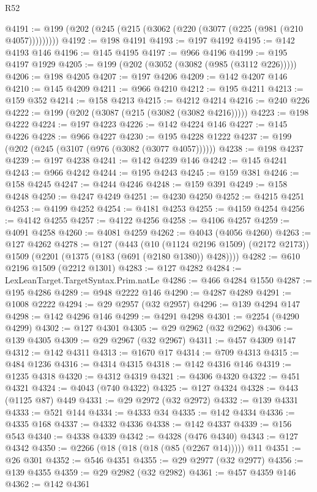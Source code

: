 \begin{lexlean}{R52}
\begin{coremodule}
@4191 := @199 (@202 (@245 (@215 (@3062 (@220 (@3077 (@225 (@981 (@210 @4057)))))))))
@4192 := @198 @4191
@4193 := @197 @4192
@4195 := @142 @4193 @146
@4196 := @145 @4195
@4197 := @966 @4196
@4199 := @195 @4197 @1929
@4205 := @199 (@202 (@3052 (@3082 (@985 (@3112 @226)))))
@4206 := @198 @4205
@4207 := @197 @4206
@4209 := @142 @4207 @146
@4210 := @145 @4209
@4211 := @966 @4210
@4212 := @195 @4211
@4213 := @159 @352
@4214 := @158 @4213
@4215 := @4212 @4214
@4216 := @240 @226
@4222 := @199 (@202 (@3087 (@215 (@3082 (@3082 @4216)))))
@4223 := @198 @4222
@4224 := @197 @4223
@4226 := @142 @4224 @146
@4227 := @145 @4226
@4228 := @966 @4227
@4230 := @195 @4228 @1222
@4237 := @199 (@202 (@245 (@3107 (@976 (@3082 (@3077 @4057))))))
@4238 := @198 @4237
@4239 := @197 @4238
@4241 := @142 @4239 @146
@4242 := @145 @4241
@4243 := @966 @4242
@4244 := @195 @4243
@4245 := @159 @381
@4246 := @158 @4245
@4247 := @4244 @4246
@4248 := @159 @391
@4249 := @158 @4248
@4250 := @4247 @4249
@4251 := @4230 @4250
@4252 := @4215 @4251
@4253 := @4199 @4252
@4254 := @4181 @4253
@4255 := @4159 @4254
@4256 := @4142 @4255
@4257 := @4122 @4256
@4258 := @4106 @4257
@4259 := @4091 @4258
@4260 := @4081 @4259
@4262 := @4043 (@4056 @4260)
@4263 := @127 @4262
@4278 := @127
    (@443
      (@10 (@1124 @2196 @1509) (@2172 @2173))
      @1509
      (@2201 (@1375 (@183 (@691 (@2180 @1380)) @428))))
@4282 := @610 @2196 @1509 (@2212 @1301)
@4283 := @127 @4282
@4284 := LexLeanTarget.TargetSyntax.Prim.natLe
@4286 := @466 @4284 @1550
@4287 := @195 @4286
@4289 := @948 @2222 @146
@4290 := @4287 @4289
@4291 := @1008 @2222
@4294 := @29 @2957 (@32 @2957)
@4296 := @139 @4294 @147
@4298 := @142 @4296 @146
@4299 := @4291 @4298
@4301 := @2254 (@4290 @4299)
@4302 := @127 @4301
@4305 := @29 @2962 (@32 @2962)
@4306 := @139 @4305
@4309 := @29 @2967 (@32 @2967)
@4311 := @457 @4309 @147
@4312 := @142 @4311
@4313 := @1670 @17
@4314 := @709 @4313
@4315 := @484 @1236
@4316 := @4314 @4315
@4318 := @142 @4316 @146
@4319 := @1235 @4318
@4320 := @4312 @4319
@4321 := @4306 @4320
@4322 := @451 @4321
@4324 := @4043 (@740 @4322)
@4325 := @127 @4324
@4328 := @443 (@1125 @87) @449
@4331 := @29 @2972 (@32 @2972)
@4332 := @139 @4331
@4333 := @521 @144
@4334 := @4333 @34
@4335 := @142 @4334
@4336 := @4335 @168
@4337 := @4332 @4336
@4338 := @142 @4337
@4339 := @156 @543
@4340 := @4338 @4339
@4342 := @4328 (@476 @4340)
@4343 := @127 @4342
@4350 := @2266 (@18 (@18 (@18 (@85 (@2267 @14))))) @11
@4351 := @26 @301
@4352 := @546 @4351
@4355 := @29 @2977 (@32 @2977)
@4356 := @139 @4355
@4359 := @29 @2982 (@32 @2982)
@4361 := @457 @4359 @146
@4362 := @142 @4361

\end{coremodule}
\end{lexlean}
